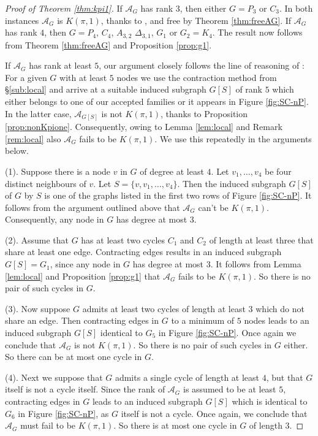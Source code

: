 \documentclass[12pt]{amsart}
\newcommand\CA{{\mathscr A}}
\numberwithin{equation}{section}
\theoremstyle{plain}
\theoremstyle{definition}
\begin{document}
\begin{proof}[Proof of Theorem \ref{thm:kpi1}]
	If $\CA_G$ has rank $3$, then either $G = P_3$ or $C_3$. In both instances $\CA_G$ is $K(\pi,1)$, thanks to \cite[Thm.~7.2]{cuntzkuehne:subgraphs}, and free by Theorem \ref{thm:freeAG}. If $\CA_G$ has rank $4$, then $G = P_4$, $C_4$, $A_{3,2}$ $\Delta_{3,1}$, $G_1$ or $G_2 = K_4$. 
	The result now follows from Theorem \ref{thm:freeAG} and Proposition \ref{prop:g1}.
	
	
	If $\CA_G$ has rank at least $5$, our argument closely follows  the line of reasoning of \cite[Thm.~6.7]{cuntzkuehne:subgraphs}:
For a given $G$ with at least $5$ nodes we use the contraction method from \S \ref{sub:local} and arrive at a suitable induced subgraph $G[S]$ of rank $5$ which
either belongs to one of our accepted families  or it appears in Figure \ref{fig:SC-nP}. In the latter case, $\CA_{G[S]}$ is not $K(\pi,1)$, thanks to Proposition \ref{prop:nonKpione}. Consequently,
owing to Lemma \ref{lem:local} and Remark \ref{rem:local} also $\CA_G$ fails to be $K(\pi,1)$.
We use this repeatedly in the arguments below.

	(1). Suppose there is a node $v$ in $G$ of degree at least $4$. Let $v_1, \ldots, v_4$ be four distinct neighbours of $v$. Let $S = \{v, v_1, \ldots, v_4\}$. Then the induced subgraph $G[S]$  of $G$ by $S$ is one of the graphs listed in the first two rows of Figure \ref{fig:SC-nP}.
	It follows from the argument outlined above that
	$\CA_G$ can't be $K(\pi,1)$.
	 Consequently, any node in $G$ has degree at most $3$.

	(2). Assume that $G$ has at least two cycles $C_1$ and $C_2$ of length at least three that share at least one
	edge. Contracting edges results in an induced subgraph $G[S] = G_1$, since any node in $G$ has degree at most $3$. It follows from 
 Lemma \ref{lem:local} and Proposition \ref{prop:g1} that $\CA_G$ fails to be $K(\pi,1)$.
	So there is no pair of such cycles in $G$.

	(3). Now suppose $G$ admits at least two cycles of length at least $3$ which do not share an edge. Then contracting edges in $G$ to a minimum of $5$ nodes leads to an induced subgraph $G[S]$ identical to $G_5$ in
	Figure \ref{fig:SC-nP}.
	Once again we conclude that $\CA_G$ is not $K(\pi,1)$.
	So there is no pair of such cycles in $G$ either.
	So there can be at most one cycle in $G$.

	(4). Next we suppose that $G$ admits a single cycle of length at least $4$, but that $G$ itself is not a cycle itself. Since the rank of $\CA_G$ is assumed to be at least $5$, contracting edges in $G$ leads to an induced subgraph $G[S]$ which is identical to $G_6$ in
	Figure \ref{fig:SC-nP}, as $G$ itself is not a cycle. Once again, we conclude that $\CA_G$ must fail to be $K(\pi,1)$.
	So there is at most one cycle in $G$ of length $3$.


\end{proof}
\end{document}

